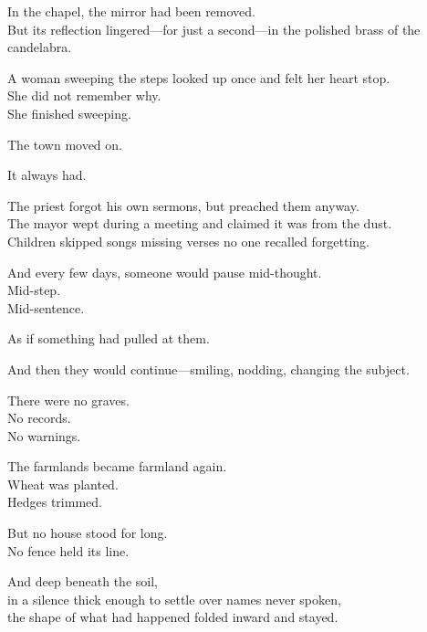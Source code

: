 \documentclass[9pt]{article}
\begin{document}
\vspace{0.5em}
In the chapel, the mirror had been removed.\\
But its reflection lingered---for just a second---in the polished brass of the candelabra.

\vspace{0.5em}
A woman sweeping the steps looked up once and felt her heart stop.\\
She did not remember why.\\
She finished sweeping.

\vspace{0.5em}
The town moved on.

\vspace{0.5em}
It always had.

\vspace{0.5em}
The priest forgot his own sermons, but preached them anyway.\\
The mayor wept during a meeting and claimed it was from the dust.\\
Children skipped songs missing verses no one recalled forgetting.

\vspace{0.5em}
And every few days, someone would pause mid-thought.\\
Mid-step.\\
Mid-sentence.

\vspace{0.5em}
As if something had pulled at them.

\vspace{0.5em}
And then they would continue---smiling, nodding, changing the subject.

\vspace{0.5em}
There were no graves.\\
No records.\\
No warnings.

\vspace{0.5em}
The farmlands became farmland again.\\
Wheat was planted.\\
Hedges trimmed.

\vspace{0.5em}
But no house stood for long.\\
No fence held its line.

\vspace{0.5em}
And deep beneath the soil,\\
in a silence thick enough to settle over names never spoken,\\
the shape of what had happened folded inward and stayed.
\end{document}
